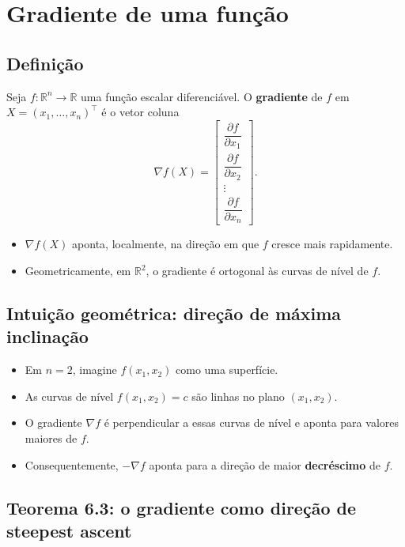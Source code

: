 \documentclass[9pt,a4paper]{extarticle}
\begin{document}
\section{Gradiente de uma função}

\subsection{Definição}

Seja $f:\mathbb{R}^n \to \mathbb{R}$ uma função escalar diferenciável. O \textbf{gradiente} de $f$ em $X = (x_1,\dots,x_n)^\top$ é o vetor coluna
\[
  \nabla f(X) =
  \begin{bmatrix}
    \dfrac{\partial f}{\partial x_1} \\[0.5em]
    \dfrac{\partial f}{\partial x_2} \\
    \vdots \\
    \dfrac{\partial f}{\partial x_n}
  \end{bmatrix}.
\]

\begin{itemize}
    \item $\nabla f(X)$ aponta, localmente, na direção em que $f$ cresce mais rapidamente.
    \item Geometricamente, em $\mathbb{R}^2$, o gradiente é ortogonal às curvas de nível de $f$.
\end{itemize}

\subsection{Intuição geométrica: direção de máxima inclinação}

\begin{itemize}
    \item Em $n=2$, imagine $f(x_1,x_2)$ como uma superfície.
    \item As curvas de nível $f(x_1,x_2)=c$ são linhas no plano $(x_1,x_2)$.
    \item O gradiente $\nabla f$ é perpendicular a essas curvas de nível e aponta para valores maiores de $f$.
    \item Consequentemente, $-\nabla f$ aponta para a direção de maior \textbf{decréscimo} de $f$.
\end{itemize}

\subsection{Teorema 6.3: o gradiente como direção de steepest ascent}
\end{document}
